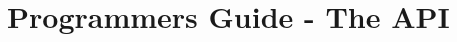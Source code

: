 \part{Programmers Guide - The API}

\newpage


\newpage


\newpage


\newpage


\newpage


\newpage
